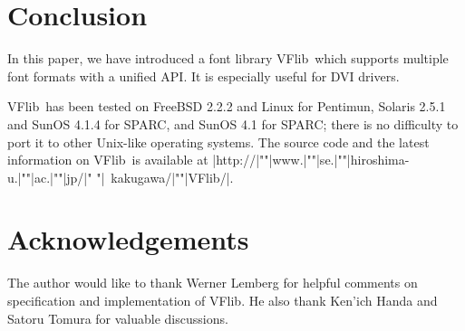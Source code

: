 \documentclass{cah-gut}
\newcommand{\pkg}[1]{\textsf{#1}}
\newcommand{\VFlib}{\pkg{VFlib}}
\begin{document}
\section{Conclusion}
\label{SEC:Conclusion}

In this paper, we have introduced a font library \VFlib\ which
supports multiple font formats with a unified API.  
It is especially useful for DVI drivers.

\VFlib\ has been tested on 
FreeBSD 2.2.2 and Linux for Pentimun, 
Solaris 2.5.1 and SunOS 4.1.4 for SPARC, and
SunOS 4.1 for SPARC; 
there is no difficulty to port it to other Unix-like operating systems.  
The source code and the latest information on \VFlib\ 
is available at 
|http://|""|www.|""|se.|""|hiroshima-u.|""|ac.|""|jp/|"%
"|~kakugawa/|""|VFlib/|.


\section*{Acknowledgements}
The author would like to thank Werner Lemberg for helpful comments 
on specification and implementation of \VFlib.
He also thank Ken'ich Handa and Satoru Tomura for 
valuable discussions.





\nocite{*}


\end{document}
